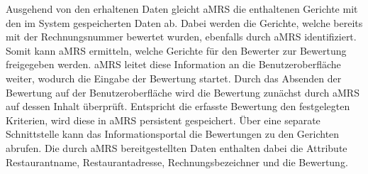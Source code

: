 Ausgehend von den erhaltenen Daten gleicht \ac{aMRS} die enthaltenen Gerichte mit den im System gespeicherten Daten ab.
Dabei werden die Gerichte, welche bereits mit der Rechnungsnummer bewertet wurden, ebenfalls durch \ac{aMRS} identifiziert.
Somit kann \ac{aMRS} ermitteln, welche Gerichte für den Bewerter zur Bewertung freigegeben werden.
\ac{aMRS} leitet diese Information an die Benutzeroberfläche weiter, wodurch die Eingabe der Bewertung startet.
\newparagraph
Durch das Absenden der Bewertung auf der Benutzeroberfläche wird die Bewertung zunächst durch \ac{aMRS} auf dessen Inhalt überprüft.
Entspricht die erfasste Bewertung den festgelegten Kriterien, wird diese in \ac{aMRS} persistent gespeichert.
\newparagraph
Über eine separate Schnittstelle kann das Informationsportal die Bewertungen zu den Gerichten abrufen.
Die durch \ac{aMRS} bereitgestellten Daten enthalten dabei die Attribute Restaurantname, Restaurantadresse, Rechnungsbezeichner und die Bewertung.
